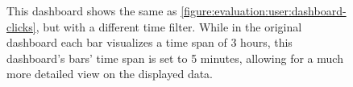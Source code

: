 \begin{figure}[t]
        \caption[Click dashboard with a more specific time filter.]{
        This dashboard shows the same as \cref{figure:evaluation:user:dashboard-clicks}, but with a different time filter.
	While in the original dashboard each bar visualizes a time span of 3 hours, this dashboard's bars' time span is set to 5 minutes, allowing for a much more detailed view on the displayed data.
        }
        \label{figure:evaluation:user:dashboard-clicks-zoom}
\end{figure}

